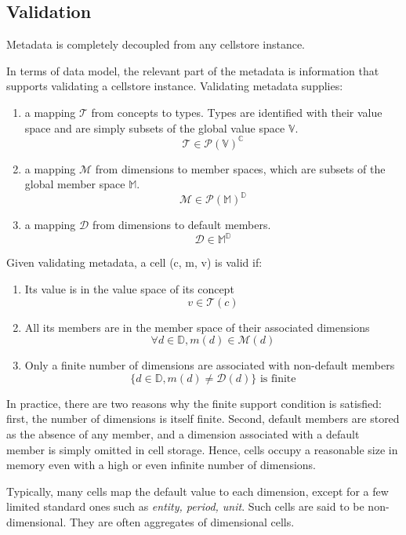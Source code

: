 \documentclass{acm_proc_article-sp}
\begin{document}
\subsection{Validation}

Metadata is completely decoupled from any cellstore instance.

In terms of data model, the relevant part of the metadata is information that supports validating a cellstore instance. Validating metadata supplies:

\begin{enumerate}
\item a mapping $\mathcal{T}$ from concepts to types. Types are identified with their value space and are simply subsets of the global value space $\mathbb{V}$.
$$\mathcal{T}\in\mathcal{P}(\mathbb{V})^\mathbb{C}$$

\item a mapping $\mathcal{M}$ from dimensions to member spaces, which are subsets of the global member space $\mathbb{M}$.
$$\mathcal{M}\in\mathcal{P}(\mathbb{M})^\mathbb{D}$$

\item a mapping $\mathcal{D}$ from dimensions to default members.
$$\mathcal{D}\in\mathbb{M}^\mathbb{D}$$
\end{enumerate}

Given validating metadata, a cell (c, m, v) is valid if:
\begin{enumerate}
\item Its value is in the value space of its concept
$$v\in\mathcal{T}(c)$$
\item All its members are in the member space of their associated dimensions $$\forall d\in\mathbb{D}, m(d)\in\mathcal{M}(d)$$
\item Only a finite number of dimensions are associated with non-default members
$$\{d\in\mathbb{D}, m(d)\neq\mathcal{D}(d)\} \text{ is finite}$$
\end{enumerate}

In practice, there are two reasons why the finite support condition is satisfied: first, the number of dimensions is itself finite. Second, default members are stored as the absence of any member, and a dimension associated with a default member is simply omitted in cell storage. Hence, cells occupy a reasonable size in memory even with a high or even infinite number of dimensions.

Typically, many cells map the default value to each dimension, except for a few limited standard ones such as \emph{entity, period, unit}. Such cells are said to be non-dimensional. They are often aggregates of dimensional cells.
\end{document}

